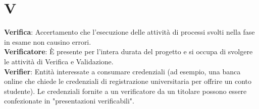 \section*{V}
\textbf{Verifica}: Accertamento che l’esecuzione delle attività di processi svolti nella fase in esame non causino errori.\\
\textbf{Verificatore}: È presente per l'intera durata del progetto e si occupa di svolgere le attività di Verifica e Validazione.\\
\textbf{Verifier}: Entità interessate a consumare credenziali (ad esempio, una banca online che chiede le credenziali di registrazione universitaria per offrire un conto studente). Le credenziali fornite a un verificatore da un titolare possono essere confezionate in "presentazioni verificabili".\\
